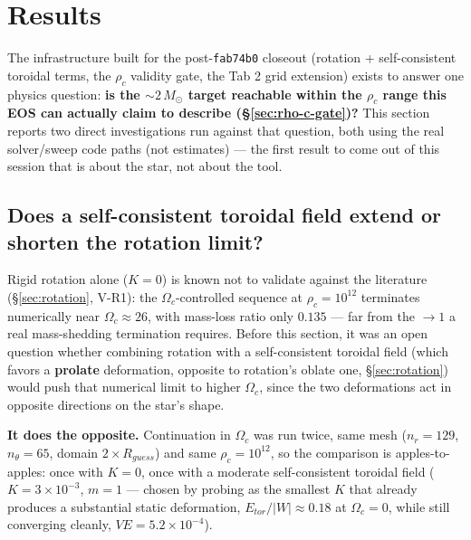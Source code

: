 \documentclass[11pt,a4paper]{scrartcl}
\newcommand{\code}[1]{\texttt{\small #1}}
\begin{document}
\section{Results}
\label{sec:results}

The infrastructure built for the post-\code{fab74b0} closeout (rotation
+ self-consistent toroidal terms, the $\rho_c$ validity gate, the Tab 2
grid extension) exists to answer one physics question: \textbf{is the
$\sim2\,M_\odot$ target reachable within the $\rho_c$ range this EOS
can actually claim to describe (\S\ref{sec:rho-c-gate})?} This section
reports two direct investigations run against that question, both using
the real solver/sweep code paths (not estimates) --- the first result
to come out of this session that is about the star, not about the tool.

\subsection{Does a self-consistent toroidal field extend or shorten the rotation limit?}

Rigid rotation alone ($K=0$) is known not to validate against the
literature (\S\ref{sec:rotation}, V-R1): the $\Omega_c$-controlled
sequence at $\rho_c=10^{12}$ terminates numerically near
$\Omega_c\approx26$, with mass-loss ratio only $0.135$ --- far from the
$\to1$ a real mass-shedding termination requires. Before this section,
it was an open question whether combining rotation with a
self-consistent toroidal field (which favors a \textbf{prolate}
deformation, opposite to rotation's oblate one, \S\ref{sec:rotation})
would push that numerical limit to higher $\Omega_c$, since the two
deformations act in opposite directions on the star's shape.

\textbf{It does the opposite.} Continuation in $\Omega_c$ was run
twice, same mesh ($n_r=129$, $n_\theta=65$, domain $2\times R_{guess}$)
and same $\rho_c=10^{12}$, so the comparison is apples-to-apples: once
with $K=0$, once with a moderate self-consistent toroidal field
($K=3\times10^{-3}$, $m=1$ --- chosen by probing as the smallest $K$
that already produces a substantial static deformation,
$E_{tor}/|W|\approx0.18$ at $\Omega_c=0$, while still converging
cleanly, $VE=5.2\times10^{-4}$).
\end{document}
